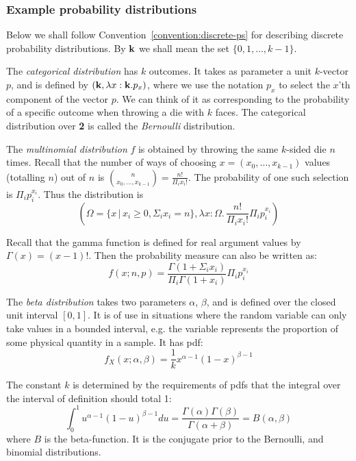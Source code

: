 \documentclass{article}
\newcommand{\Beta}{B}
\newcommand{\alt}{\,|\,}
\theoremstyle{definition}
\begin{document}
    
    
\subsubsection{Example probability distributions}
Below we shall follow Convention~\ref{convention:discrete-ps} for describing discrete probability distributions. By \({\bf k}\) we shall mean the set \(\{0,1,\ldots, k-1\}\). 


The {\em categorical distribution} has \(k\) outcomes. It takes as parameter a unit \(k\)-vector \(p\), and is defined by \(({\bf k}, \lambda x:{\bf k}.p_x)\), where we use the notation \(p_x\) to select the \(x\)'th component of the vector \(p\). We can think of it as corresponding to the probability of a specific outcome when throwing a die with \(k\) faces. The categorical distribution over {\bf 2} is called the {\em Bernoulli} distribution. 


The {\em multinomial distribution} \(f\) is obtained by throwing the same \(k\)-sided die \(n\) times. Recall that the number of ways of choosing \(x=(x_0, \ldots, x_{k-1})\) values (totalling \(n\)) out of \(n\) is \(\binom{n}{x_0,\ldots,x_{k-1}}=\frac{n!}{\Pi_i x_i!}\). The probability of one such selection is \(\Pi_i p_i^{x_i}\). Thus the distribution is
\[ (\Omega=\{x \alt x_i \geq 0, \Sigma_i x_i = n\},
   \lambda x:\Omega.\, \frac{n!}{\Pi_i x_i!}\Pi_i p_i^{x_i})\]

Recall that the gamma function is defined for real argument values by \(\Gamma(x)=(x-1)!\). Then the probability measure can also be written as:
\[ f(x; n, p) = \frac{\Gamma(1+\Sigma_i x_i)}{\Pi_i \Gamma(1+x_i)}\Pi_i p_i^{x_i}
\]


The {\em beta distribution} takes two parameters \(\alpha\), \(\beta\), and is defined over the closed unit interval \([0,1]\). It is of use in situations where the random variable can only take values in a bounded interval, e.g.{} the variable represents the proportion of some physical quantity in a sample. It has pdf: 
\[ f_X(x; \alpha, \beta) = \frac{1}{k} x^{\alpha-1}(1-x)^{\beta-1}\]

The constant \(k\) is determined by the requirements of pdfs that the integral over the interval of definition should total 1:
\[ \int_0^1 u^{\alpha-1}(1-u)^{\beta -1} du  = \frac{\Gamma(\alpha)\Gamma(\beta)}{\Gamma(\alpha+\beta)} = \Beta(\alpha,\beta)\]
\noindent where \(\Beta\) is the beta-function. 
It is the conjugate prior to the Bernoulli, and binomial distributions.
\end{document}
